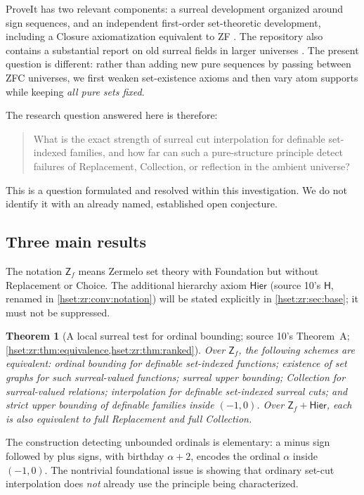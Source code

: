 \documentclass[11pt,letterpaper]{article}
\newtheorem{theorem}{Theorem}[section]
\theoremstyle{definition}
\theoremstyle{remark}
\newcommand{\Zf}{\mathsf{Z}_{\!f}}
\newcommand{\Hier}{\mathsf{Hier}}
\begin{document}
ProveIt has two relevant components: a surreal development organized around sign sequences, and an independent first-order set-theoretic development, including a Closure axiomatization equivalent to ZF \cite{ProveItSurreal,ProveItClosure}. The repository also contains a substantial report on old surreal fields in larger universes \cite{ProveItUniverses}. The present question is different: rather than adding new pure sequences by passing between ZFC universes, we first weaken set-existence axioms and then vary atom supports while keeping \emph{all pure sets fixed}.

The research question answered here is therefore:
\begin{quote}
What is the exact strength of surreal cut interpolation for definable set-indexed families, and how far can such a pure-structure principle detect failures of Replacement, Collection, or reflection in the ambient universe?
\end{quote}
This is a question formulated and resolved within this investigation. We do not identify it with an already named, established open conjecture.

\subsection{Three main results}
The notation $\Zf$ means Zermelo set theory with Foundation but without Replacement or Choice. The additional hierarchy axiom $\Hier$ (source 10's $\mathsf H$, renamed in \cref{hset:zr:conv:notation}) will be stated explicitly in \cref{hset:zr:sec:base}; it must not be suppressed.

\begin{theorem}[A local surreal test for ordinal bounding; source 10's Theorem~A; \cref{hset:zr:thm:equivalence,hset:zr:thm:ranked}]
\label{hset:zr:thm:A}
Over $\Zf$, the following schemes are equivalent: ordinal bounding for definable set-indexed functions; existence of set graphs for such surreal-valued functions; surreal upper bounding; Collection for surreal-valued relations; interpolation for definable set-indexed surreal cuts; and strict upper bounding of definable families inside $(-1,0)$. Over $\Zf+\Hier$, each is also equivalent to full Replacement and full Collection.
\end{theorem}
The construction detecting unbounded ordinals is elementary: a minus sign followed by plus signs, with birthday $\alpha+2$, encodes the ordinal $\alpha$ inside $(-1,0)$. The nontrivial foundational issue is showing that ordinary set-cut interpolation does \emph{not} already use the principle being characterized.
\end{document}
